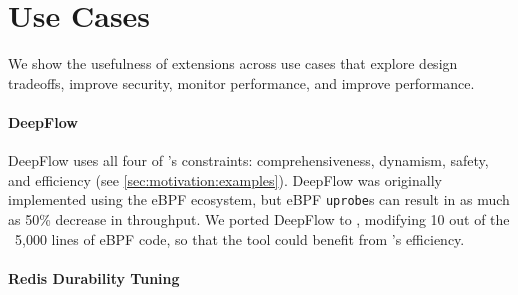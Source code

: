\section{Use Cases}\label{sec:use_cases}
We show the usefulness of \sys extensions across \numcases use cases that explore design tradeoffs, improve security, monitor performance, and improve performance.

\paragraph{DeepFlow}
DeepFlow uses all four of \sys{}'s constraints: comprehensiveness, dynamism, safety, and efficiency (see \cref{sec:motivation:examples}).  DeepFlow was originally implemented using the eBPF ecosystem, but eBPF \texttt{uprobe}s can result in as much as 50\% decrease in throughput.  We ported DeepFlow to \sys, modifying 10 out of the ~5,000 lines of eBPF code, so that the tool could benefit from \sys's efficiency.

\paragraph{Redis Durability Tuning}



